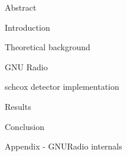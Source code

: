 




\usepackage{antropy_en}


  

  \newpage
  \tableofcontents

  \begin{topchapter}{Abstract}
    
  \end{topchapter}

  \begin{topchapter}{Introduction}
    
  \end{topchapter}

  \begin{topchapter}{Theoretical background}
    
  \end{topchapter}

  \begin{topchapter}{GNU Radio}
    
  \end{topchapter}

  \begin{topchapter}{\acrlong{schcox} detector implementation}
    
  \end{topchapter}

  \begin{topchapter}{Results}
    
  \end{topchapter}

  \begin{topchapter}{Conclusion}
    
  \end{topchapter}

  \begin{topchapter}{Appendix - GNURadio internals}
    
  \end{topchapter}

  \newpage
  \printglossaries
  \printbibliography

  \vfill
  
  

